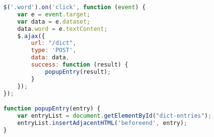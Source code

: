 

\begin{lstlisting}[caption={[Gloss Javascript] Javascript/JQuery code for obtaining gloss content from the server and then inserting it into the web page.}, label=lst:gloss, language=javascript, float]
$('.word').on('click', function (event) {
	var e = event.target;
	var data = e.dataset;
	data.word = e.textContent;
	$.ajax({
		url: "/dict",
		type: 'POST',
		data: data,
		success: function (result) {
			popupEntry(result);
		}
	});
});

function popupEntry(entry) {
	var entryList = document.getElementById("dict-entries");
	entryList.insertAdjacentHTML('beforeend', entry);
}

\end{lstlisting}